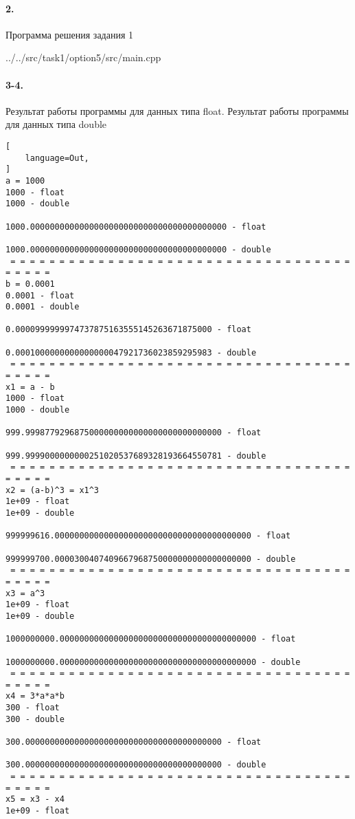 \paragraph{2.} Программа решения задания 1


{../../src/task1/option5/src/main.cpp}

\paragraph{3-4.} Результат работы программы для данных типа float. Результат работы программы для данных типа double

\begin{lstlisting}[
    language=Out,
]
a = 1000
1000 - float
1000 - double
                                   1000.0000000000000000000000000000000000000000 - float
                                   1000.0000000000000000000000000000000000000000 - double
 = = = = = = = = = = = = = = = = = = = = = = = = = = = = = = = = = = = = = = = =
b = 0.0001
0.0001 - float
0.0001 - double
                                      0.0000999999974737875163555145263671875000 - float
                                      0.0001000000000000000047921736023859295983 - double
 = = = = = = = = = = = = = = = = = = = = = = = = = = = = = = = = = = = = = = = =
x1 = a - b
1000 - float
1000 - double
                                    999.9998779296875000000000000000000000000000 - float
                                    999.9999000000000251020537689328193664550781 - double
 = = = = = = = = = = = = = = = = = = = = = = = = = = = = = = = = = = = = = = = =
x2 = (a-b)^3 = x1^3
1e+09 - float
1e+09 - double
                              999999616.0000000000000000000000000000000000000000 - float
                              999999700.0000300407409667968750000000000000000000 - double
 = = = = = = = = = = = = = = = = = = = = = = = = = = = = = = = = = = = = = = = =
x3 = a^3
1e+09 - float
1e+09 - double
                             1000000000.0000000000000000000000000000000000000000 - float
                             1000000000.0000000000000000000000000000000000000000 - double
 = = = = = = = = = = = = = = = = = = = = = = = = = = = = = = = = = = = = = = = =
x4 = 3*a*a*b
300 - float
300 - double
                                    300.0000000000000000000000000000000000000000 - float
                                    300.0000000000000000000000000000000000000000 - double
 = = = = = = = = = = = = = = = = = = = = = = = = = = = = = = = = = = = = = = = =
x5 = x3 - x4
1e+09 - float

\end{lstlisting}
